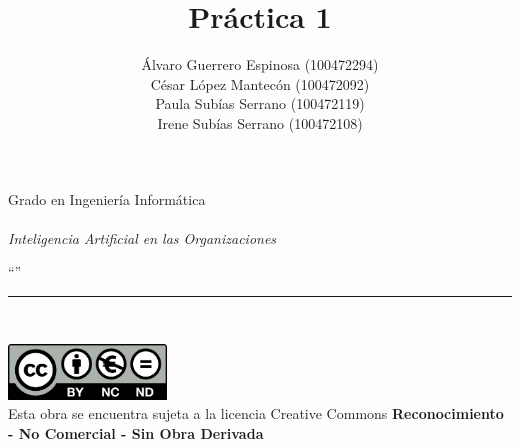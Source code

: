 \documentclass[12pt]{report} %
\begin{document}

\title{Práctica 1}
\author{Álvaro Guerrero Espinosa (100472294)\\
        César López Mantecón (100472092)\\
        Paula Subías Serrano (100472119)\\
        Irene Subías Serrano (100472108)\\}

\makeatletter
\begin{titlepage}
    \begin{sffamily}
    \color{azulUC3M}
    \begin{center}
        \begin{figure}[H] %
        \end{figure}
        \vspace{2.5cm}
        \begin{Large}
            Grado en Ingeniería Informática\\
            \@date\\
            \vspace{2cm}
            \textsl{Inteligencia Artificial en las Organizaciones}\\
            \bigskip
        \end{Large}
        {\Huge ``\@title''}\\
        \vspace*{0.5cm}
        \rule{10.5cm}{0.1mm}\\
        \vspace*{0.9cm}
        {\LARGE\@author}
        \vspace*{1cm}
    \end{center}
    \vfill
    \color{black}
    \includegraphics[width=4.2cm]{creativecommons.png}\\ %
    Esta obra se encuentra sujeta a la licencia Creative Commons \textbf{Reconocimiento - No Comercial - Sin Obra Derivada}
    \end{sffamily}
\end{titlepage}
\makeatother
\end{document}
